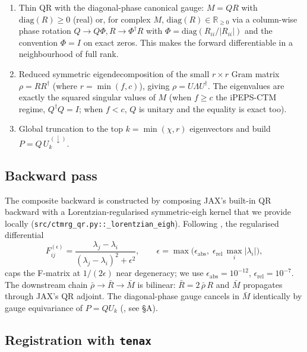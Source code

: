 \documentclass[aps,prresearch,reprint,amsmath,amssymb,floatfix]{revtex4-2}
\newcommand{\tenax}{\texttt{tenax}}
\newcommand{\code}[1]{\texttt{#1}}
\begin{document}
\begin{enumerate}
  \item Thin QR with the diagonal-phase canonical gauge:
  $M = QR$ with $\mathrm{diag}(R)\ge 0$ (real) or, for complex $M$,
  $\mathrm{diag}(R)\in\mathbb{R}_{\ge 0}$ via a column-wise phase rotation
  $Q\to Q\Phi,R\to\Phi^\dagger R$ with
  $\Phi=\mathrm{diag}(R_{ii}/|R_{ii}|)$ and the convention $\Phi=I$ on
  exact zeros. This makes the forward differentiable in a neighbourhood of
  full rank.
  \item Reduced symmetric eigendecomposition of the small $r\times r$ Gram
  matrix $\rho = RR^\dagger$ (where $r=\min(f,c)$), giving
  $\rho = U\Lambda U^\dagger$. The eigenvalues are exactly the squared
  singular values of $M$ (when $f\ge c$ the iPEPS-CTM regime, $Q^\dagger Q
  = I$; when $f<c$, $Q$ is unitary and the equality is exact too).
  \item Global truncation to the top $k=\min(\chi, r)$ eigenvectors and
  build $P = Q\,U_{k}^{\,(\downarrow)}$.
\end{enumerate}

\subsection{Backward pass}

The composite backward is constructed by composing JAX's built-in QR backward
with a Lorentzian-regularised symmetric-eigh kernel that we provide locally
(\code{src/ctmrg\_qr.py::\_lorentzian\_eigh}). Following \cite{Francuz2025},
the regularised differential
\begin{equation}
F^{(\epsilon)}_{ij} = \frac{\lambda_j-\lambda_i}{(\lambda_j-\lambda_i)^2 + \epsilon^2},
\qquad
\epsilon = \max\!\bigl(\epsilon_{\mathrm{abs}},\;\epsilon_{\mathrm{rel}}\,\max_i|\lambda_i|\bigr),
\end{equation}
caps the F-matrix at $1/(2\epsilon)$ near degeneracy; we use
$\epsilon_{\mathrm{abs}}=10^{-12}$, $\epsilon_{\mathrm{rel}}=10^{-7}$.
The downstream chain $\bar\rho\to\bar R\to\bar M$ is bilinear:
$\bar R = 2\,\bar\rho\,R$ and $\bar M$ propagates through JAX's QR adjoint.
The diagonal-phase gauge cancels in $\bar M$ identically by gauge
equivariance of $P=QU_k$ (\cite{Walter2010}, see \S A).

\subsection{Registration with \tenax}
\end{document}
